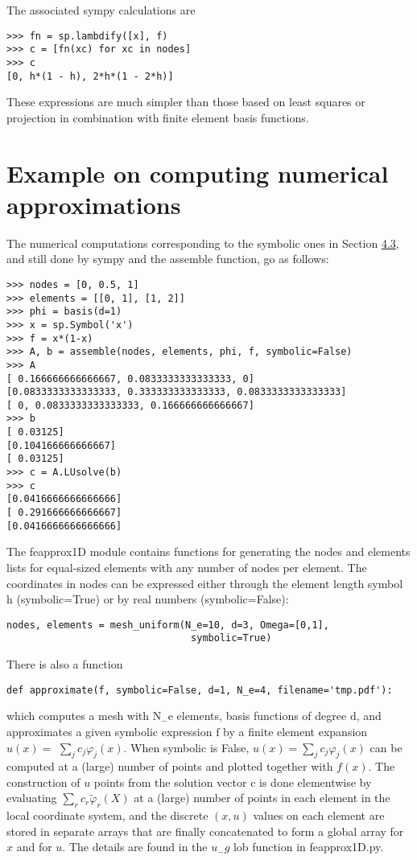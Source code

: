 \documentclass[../main.tex]{subfiles}
\begin{document}
The associated sympy calculations are
\begin{lstlisting}[numbers=none]
>>> fn = sp.lambdify([x], f)
>>> c = [fn(xc) for xc in nodes]
>>> c
[0, h*(1 - h), 2*h*(1 - 2*h)]
\end{lstlisting}
These expressions are much simpler than those based on least squares or projection in combination with finite element basis functions.
\section[Example on computing numerical approximations]{Example on computing numerical approximations}
\label{sec:sec_4_5}
The numerical computations corresponding to the symbolic ones in Section \hyperref[sec:sec_4_3]{4.3},
and still done by sympy and the assemble function, go as follows:
\begin{lstlisting}[numbers=none]
>>> nodes = [0, 0.5, 1]
>>> elements = [[0, 1], [1, 2]]
>>> phi = basis(d=1)
>>> x = sp.Symbol('x')
>>> f = x*(1-x)
>>> A, b = assemble(nodes, elements, phi, f, symbolic=False)
>>> A
[ 0.166666666666667, 0.0833333333333333, 0]
[0.0833333333333333, 0.333333333333333, 0.0833333333333333]
[ 0, 0.0833333333333333, 0.166666666666667]
>>> b
[ 0.03125]
[0.104166666666667]
[ 0.03125]
>>> c = A.LUsolve(b)
>>> c
[0.0416666666666666]
[ 0.291666666666667]
[0.0416666666666666]	
\end{lstlisting}
The fe\textunderscore approx1D module contains functions for generating the nodes and
elements lists for equal-sized elements with any number of nodes per element.
The coordinates in nodes can be expressed either through the element length
symbol h (symbolic=True) or by real numbers (symbolic=False):
\begin{lstlisting}[numbers=none]
nodes, elements = mesh_uniform(N_e=10, d=3, Omega=[0,1],
								symbolic=True)	
\end{lstlisting}
There is also a function
\begin{lstlisting}[numbers=none]
def approximate(f, symbolic=False, d=1, N_e=4, filename='tmp.pdf'):
\end{lstlisting}
which computes a mesh with $\mathrm{N}_{-}$e elements, basis functions of degree $\mathrm{d}$, and approximates a given symbolic expression $\mathrm{f}$ by a finite element expansion $u(x)=$ $\sum_{j} c_{j} \varphi_{j}(x)$. When symbolic is False, $u(x)=\sum_{j} c_{j} \varphi_{j}(x)$ can be computed at a (large) number of points and plotted together with $f(x)$. The construction of $u$ points from the solution vector $\mathrm{c}$ is done elementwise by evaluating $\sum_{r} c_{r} \tilde{\varphi}_{r}(X)$ at a (large) number of points in each element in the local coordinate system, and the discrete $(x, u)$ values on each element are stored in separate arrays that are finally concatenated to form a global array for $x$ and for $u$. The details are found in the $u_{-} g$ lob function in fe\textunderscore approx1D.py.
\end{document}
